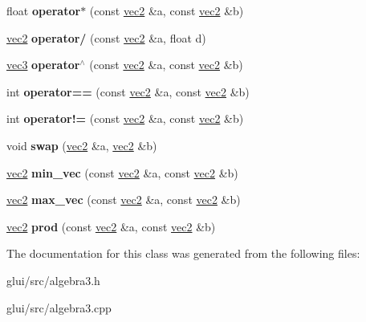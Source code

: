 \begin{DoxyCompactItemize}
\item 
\hypertarget{classvec2_ab2d6c7aa61948785e334abbc6d06af22}{float {\bfseries operator$\ast$} (const \hyperlink{classvec2}{vec2} \&a, const \hyperlink{classvec2}{vec2} \&b)}\label{classvec2_ab2d6c7aa61948785e334abbc6d06af22}

\item 
\hypertarget{classvec2_ac039e11bc3163c3b2a73f618466ba1cc}{\hyperlink{classvec2}{vec2} {\bfseries operator/} (const \hyperlink{classvec2}{vec2} \&a, float d)}\label{classvec2_ac039e11bc3163c3b2a73f618466ba1cc}

\item 
\hypertarget{classvec2_aac6b3e1eec62f338713b46d70c63d7d3}{\hyperlink{classvec3}{vec3} {\bfseries operator$^\wedge$} (const \hyperlink{classvec2}{vec2} \&a, const \hyperlink{classvec2}{vec2} \&b)}\label{classvec2_aac6b3e1eec62f338713b46d70c63d7d3}

\item 
\hypertarget{classvec2_afdf120b1c31612eaba7789d6fda1d8c1}{int {\bfseries operator==} (const \hyperlink{classvec2}{vec2} \&a, const \hyperlink{classvec2}{vec2} \&b)}\label{classvec2_afdf120b1c31612eaba7789d6fda1d8c1}

\item 
\hypertarget{classvec2_aea40727983a519330d962da873e04c51}{int {\bfseries operator!=} (const \hyperlink{classvec2}{vec2} \&a, const \hyperlink{classvec2}{vec2} \&b)}\label{classvec2_aea40727983a519330d962da873e04c51}

\item 
\hypertarget{classvec2_a9b33ecbc9fbb7e87fdbcef79dac05d2a}{void {\bfseries swap} (\hyperlink{classvec2}{vec2} \&a, \hyperlink{classvec2}{vec2} \&b)}\label{classvec2_a9b33ecbc9fbb7e87fdbcef79dac05d2a}

\item 
\hypertarget{classvec2_aff3e8468eb3b4266eb4419946108b775}{\hyperlink{classvec2}{vec2} {\bfseries min\-\_\-vec} (const \hyperlink{classvec2}{vec2} \&a, const \hyperlink{classvec2}{vec2} \&b)}\label{classvec2_aff3e8468eb3b4266eb4419946108b775}

\item 
\hypertarget{classvec2_a63686a4102a83cf5bbce825b19e0e388}{\hyperlink{classvec2}{vec2} {\bfseries max\-\_\-vec} (const \hyperlink{classvec2}{vec2} \&a, const \hyperlink{classvec2}{vec2} \&b)}\label{classvec2_a63686a4102a83cf5bbce825b19e0e388}

\item 
\hypertarget{classvec2_ab34a15f1b0458bd038c54775fe93dbf6}{\hyperlink{classvec2}{vec2} {\bfseries prod} (const \hyperlink{classvec2}{vec2} \&a, const \hyperlink{classvec2}{vec2} \&b)}\label{classvec2_ab34a15f1b0458bd038c54775fe93dbf6}

\end{DoxyCompactItemize}


The documentation for this class was generated from the following files\-:\begin{DoxyCompactItemize}
\item 
glui/src/algebra3.\-h\item 
glui/src/algebra3.\-cpp\end{DoxyCompactItemize}
